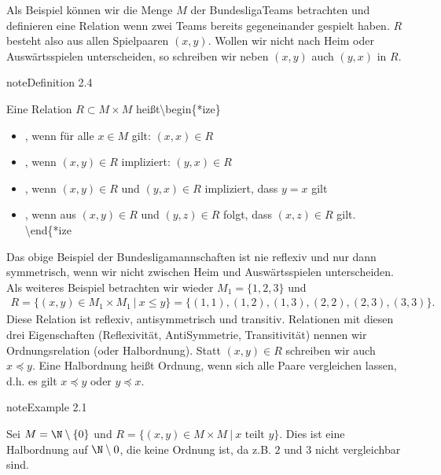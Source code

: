 \documentclass[letterpaper,10pt,english]{jupyterBook}
\begin{document}
Als Beispiel können wir die Menge \(M\) der Bundesliga\sphinxhyphen{}Teams betrachten und definieren eine Relation wenn zwei Teams bereits gegeneinander gespielt haben. \(R\) besteht also aus allen Spielpaaren \((x,y)\). Wollen wir nicht nach Heim\sphinxhyphen{} oder Auswärtsspielen unterscheiden, so schreiben wir neben \((x,y)\) auch \((y,x)\) in \(R\).
\label{grundlagen/mengenlogik:definition-4}
\begin{sphinxadmonition}{note}{Definition 2.4}



Eine Relation \(R \subset M \times M\) heißt\textbackslash{}begin\{*ize\}
\begin{itemize}
\item {} 
, wenn für alle \(x \in M\) gilt: \((x,x) \in R\)

\item {} 
, wenn \((x,y) \in R\) impliziert: \((y,x) \in R\)

\item {} 
, wenn \((x,y) \in R\) und \((y,x) \in R\) impliziert, dass \(y=x\) gilt

\item {} 
, wenn aus \((x,y) \in R\) und \((y,z) \in R\) folgt, dass \((x,z)  \in R\) gilt.
\textbackslash{}end\{*ize

\end{itemize}
\end{sphinxadmonition}

Das obige Beispiel der Bundesligamannschaften ist nie reflexiv und nur dann symmetrisch, wenn wir nicht zwischen Heim\sphinxhyphen{} und Auswärtsspielen unterscheiden. Als weiteres Beispiel betrachten wir wieder \(M_1 = \{1,2,3\}\) und
\begin{equation*}
\begin{split} R=\{(x,y) \in M_1 \times M_1~|~x \leq y\} = \{ (1,1),(1,2),(1,3),(2,2),(2,3),(3,3)\}.
 \end{split}
\end{equation*}
Diese Relation ist reflexiv, anti\sphinxhyphen{}symmetrisch und transitiv.
Relationen mit diesen drei Eigenschaften (Reflexivität, Anti\sphinxhyphen{}Symmetrie, Transitivität) nennen wir Ordnungsrelation (oder Halbordnung). Statt \((x,y) \in R\) schreiben wir auch \(x \preceq y\). Eine Halbordnung heißt Ordnung, wenn sich alle Paare vergleichen lassen, d.h. es gilt \(x \preceq y\) oder \(y \preceq x\).
\label{grundlagen/mengenlogik:example-5}
\begin{sphinxadmonition}{note}{Example 2.1}



Sei \(M= \N \setminus \{0\}\) und \(R=\{(x,y) \in M \times M~|~x \text{ teilt } y\}\). Dies ist eine Halbordnung auf \(\N \setminus 0\), die keine Ordnung ist, da z.B. \(2\) und \(3\) nicht vergleichbar sind.
\end{sphinxadmonition}
\end{document}
